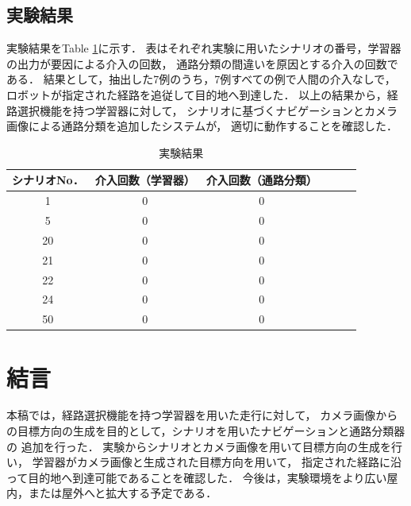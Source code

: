 \documentclass{sice-si}
\begin{document}
\subsection{実験結果}
実験結果をTable \ref{tab:result}に示す．
表はそれぞれ実験に用いたシナリオの番号，学習器の出力が要因による介入の回数，
通路分類の間違いを原因とする介入の回数である．
結果として，抽出した7例のうち，7例すべての例で人間の介入なしで，
ロボットが指定された経路を追従して目的地へ到達した．
以上の結果から，経路選択機能を持つ学習器に対して，
シナリオに基づくナビゲーションとカメラ画像による通路分類を追加したシステムが，
適切に動作することを確認した．
\begin{table}[]
    \centering
    \caption{実験結果}\label{tab:result}
    \begin{tabular}{ccclll}
    \hline
    シナリオNo． & 介入回数（学習器） & 介入回数（通路分類） \\
    \hline
    1       & 0         & 0             \\
    5       & 0         & 0             \\
    20      & 0         & 0             \\
    21      & 0         & 0             \\
    22      & 0         & 0             \\
    24      & 0         & 0             \\
    50      & 0         & 0             \\
    \hline
    \end{tabular}
    \end{table}

\section{結言}
本稿では，経路選択機能を持つ学習器を用いた走行に対して，
カメラ画像からの目標方向の生成を目的として，シナリオを用いたナビゲーションと通路分類器の
追加を行った．
実験からシナリオとカメラ画像を用いて目標方向の生成を行い，
学習器がカメラ画像と生成された目標方向を用いて，
指定された経路に沿って目的地へ到達可能であることを確認した．
今後は，実験環境をより広い屋内，または屋外へと拡大する予定である．
\end{document}
